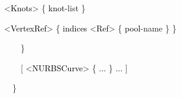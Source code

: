 \documentclass[a4paper]{article}
\newcommand\textstyleOOoComputerKeyWord[1]{\textrm{\textcolor[rgb]{0.0,0.0,0.5019608}{#1}}}
\newcommand\textstyleOOoAssemblerSpecialChar[1]{\textrm{\textcolor[rgb]{0.0,0.5019608,0.0}{#1}}}
\newcommand\textstyleOOoAssemblerIdent[1]{\textrm{\textcolor{black}{#1}}}
\newcommand\textstyleOOoAssemblerDirective[1]{\textrm{\textcolor[rgb]{0.0,0.5019608,1.0}{#1}}}
\begin{document}
{\color{black}
\textstyleOOoComputerKeyWord{\textcolor{black}{\ \ }}\textstyleOOoAssemblerSpecialChar{{\textless}}\textstyleOOoAssemblerIdent{Knots}\textstyleOOoAssemblerSpecialChar{{\textgreater}}\textstyleOOoComputerKeyWord{\textcolor{black}{
}}\textstyleOOoAssemblerSpecialChar{\{}\textstyleOOoComputerKeyWord{\textcolor{black}{
}}\textstyleOOoAssemblerIdent{knot}\textstyleOOoAssemblerSpecialChar{{}-}\textstyleOOoAssemblerDirective{list}\textstyleOOoComputerKeyWord{\textcolor{black}{
}}\textstyleOOoAssemblerSpecialChar{\}}}


\bigskip

{\color{black}
\textstyleOOoComputerKeyWord{\textcolor{black}{\ \ }}\textstyleOOoAssemblerSpecialChar{{\textless}}\textstyleOOoAssemblerIdent{VertexRef}\textstyleOOoAssemblerSpecialChar{{\textgreater}}\textstyleOOoComputerKeyWord{\textcolor{black}{
}}\textstyleOOoAssemblerSpecialChar{\{}\textstyleOOoComputerKeyWord{\textcolor{black}{
}}\textstyleOOoAssemblerIdent{indices}\textstyleOOoComputerKeyWord{\textcolor{black}{
}}\textstyleOOoAssemblerSpecialChar{{\textless}}\textstyleOOoAssemblerIdent{Ref}\textstyleOOoAssemblerSpecialChar{{\textgreater}}\textstyleOOoComputerKeyWord{\textcolor{black}{
}}\textstyleOOoAssemblerSpecialChar{\{}\textstyleOOoComputerKeyWord{\textcolor{black}{
}}\textstyleOOoAssemblerIdent{pool}\textstyleOOoAssemblerSpecialChar{{}-}\textstyleOOoAssemblerDirective{name}\textstyleOOoComputerKeyWord{\textcolor{black}{
}}\textstyleOOoAssemblerSpecialChar{\}}\textstyleOOoComputerKeyWord{\textcolor{black}{
}}\textstyleOOoAssemblerSpecialChar{\}}}

{\color{black}
\textstyleOOoComputerKeyWord{\textcolor{black}{\ \ \ \ \ \ }}\textstyleOOoAssemblerSpecialChar{\}}}

{\color{black}
\textstyleOOoComputerKeyWord{\textcolor{black}{\ \ \ \ \ \ }}\textstyleOOoAssemblerSpecialChar{[}\textstyleOOoComputerKeyWord{\textcolor{black}{
}}\textstyleOOoAssemblerSpecialChar{{\textless}}\textstyleOOoAssemblerIdent{NURBSCurve}\textstyleOOoAssemblerSpecialChar{{\textgreater}}\textstyleOOoComputerKeyWord{\textcolor{black}{
}}\textstyleOOoAssemblerSpecialChar{\{}\textstyleOOoComputerKeyWord{\textcolor{black}{
}}\textstyleOOoAssemblerIdent{...}\textstyleOOoComputerKeyWord{\textcolor{black}{
}}\textstyleOOoAssemblerSpecialChar{\}}\textstyleOOoComputerKeyWord{\textcolor{black}{
}}\textstyleOOoAssemblerIdent{...}\textstyleOOoComputerKeyWord{\textcolor{black}{
}}\textstyleOOoAssemblerSpecialChar{]}}

{\color{black}
\textstyleOOoComputerKeyWord{\textcolor{black}{\ \ \ \ }}\textstyleOOoAssemblerSpecialChar{\}}}
\end{document}
